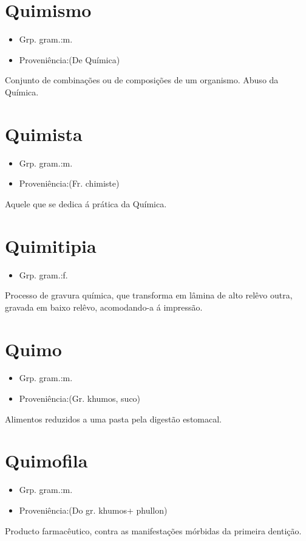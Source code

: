 \section{Quimismo}
\begin{itemize}
\item {Grp. gram.:m.}
\end{itemize}
\begin{itemize}
\item {Proveniência:(De \textunderscore Química\textunderscore )}
\end{itemize}
Conjunto de combinações ou de composições de um organismo.
Abuso da Química.
\section{Quimista}
\begin{itemize}
\item {Grp. gram.:m.}
\end{itemize}
\begin{itemize}
\item {Proveniência:(Fr. \textunderscore chimiste\textunderscore )}
\end{itemize}
Aquele que se dedica á prática da Química.
\section{Quimitipia}
\begin{itemize}
\item {Grp. gram.:f.}
\end{itemize}
Processo de gravura química, que transforma em lâmina de alto relêvo outra, gravada em baixo relêvo, acomodando-a á impressão.
\section{Quimo}
\begin{itemize}
\item {Grp. gram.:m.}
\end{itemize}
\begin{itemize}
\item {Proveniência:(Gr. \textunderscore khumos\textunderscore , suco)}
\end{itemize}
Alimentos reduzidos a uma pasta pela digestão estomacal.
\section{Quimofila}
\begin{itemize}
\item {Grp. gram.:m.}
\end{itemize}
\begin{itemize}
\item {Proveniência:(Do gr. \textunderscore khumos\textunderscore  + \textunderscore phullon\textunderscore )}
\end{itemize}
Producto farmacêutico, contra as manifestações mórbidas da primeira dentição.
